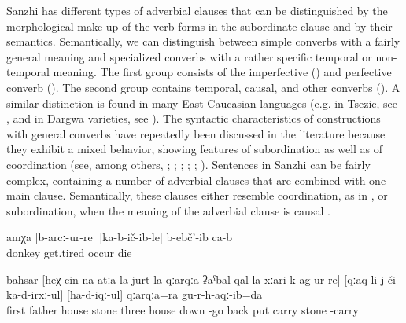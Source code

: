 Sanzhi has different types of adverbial clauses that can be distinguished by the morphological make-up of the verb forms in the subordinate clause and by their semantics. Semantically, we can distinguish between simple converbs with a fairly general meaning and specialized converbs with a rather specific temporal or non-temporal meaning. The first group consists of the imperfective () and perfective converb (). The second group contains temporal, causal, and other converbs (). A similar distinction is found in many East Caucasian languages (e.g. in Tsezic, see \citealp{Comrie.Forker.Khalilova2012}, and in Dargwa varieties, see \citealp{Belyaev2010}). The syntactic characteristics of constructions with general converbs have repeatedly been discussed in the literature  because they exhibit a mixed behavior, showing features of subordination as well as of coordination (see, among others, \citealp{Kazenin.Testelets2004}; \citealp{Haspelmath1995}; \citealp{Belyaev2010}; \citealp{Comrie.Forker.Khalilova2012}; \citealp{Creissels2010, Creissels2012}; \citealp{Forker2013b}). Sentences in Sanzhi can be fairly complex, containing a number of adverbial clauses that are combined with one main clause. Semantically, these clauses either resemble coordination, as in , or subordination, when the meaning of the adverbial clause is causal .
%
\begin{exe}
	\ex	\label{ex:‎‎‎The donkey got tired, fell down, and died}
	\gll	amχa	[b-arcː-ur-re]	[ka-b-ič-ib-le]	b-ebč'-ib	ca-b\\
		donkey	get.tired	occur	die	\\
	\glt	{}

	\ex	\label{ex:‎‎‎First, (because) the stones of father's house had fallen down}
	\gll	bahsar	[heχ	cin-na	atːa-la	jurt-la	qːarqːa	ʡaˁbal	qal-la	xːari	k-ag-ur-re]	[qːaq-li-j	či-ka-d-irxː-ul]	[ha-d-iqː-ul]	qːarqːa=ra	gu-r-h-aqː-ib=da\\
		first			father\tsc{-gen}	house	stone	three	house	down	-go		back	put\tsc{.ipfv-icvb}	carry	stone	-carry\\
	\glt	{}
\end{exe}

